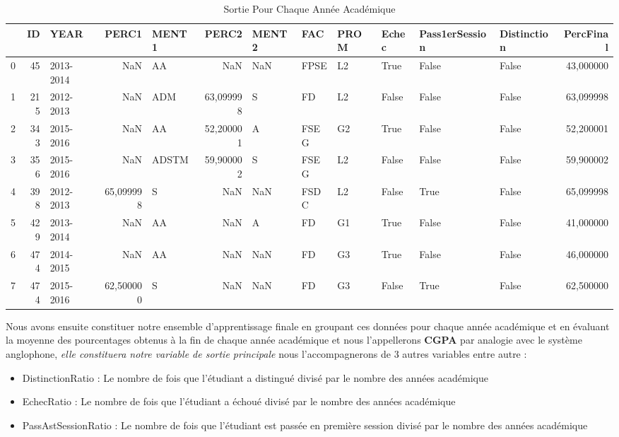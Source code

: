 \begin{table}
	\centering
	\begingroup %
	\captionsetup{type=table} %
	\caption{Sortie Pour Chaque Année Académique}
	\label{tab:Output1}
	\begin{tabular}{lrlrlrllllllr}
		\toprule
		{} &   ID &   YEAR &      PERC1 &  MENT1 &      PERC2 & MENT2 &   FAC & PROM &  Echec & Pass1erSession & Distinction &  PercFinal \\
		\midrule
		0 &   45 &  2013-2014 &        NaN &     AA &        NaN &   NaN &  FPSE &   L2 &   True &          False &       False &  43,000000 \\
		1 &  215 &  2012-2013 &        NaN &    ADM &  63,099998 &     S &    FD &   L2 &  False &          False &       False &  63,099998 \\
		2 &  343 &  2015-2016 &        NaN &     AA &  52,200001 &     A &  FSEG &   G2 &   True &          False &       False &  52,200001 \\
		3 &  356 &  2015-2016 &        NaN &  ADSTM &  59,900002 &     S &  FSEG &   L2 &  False &          False &       False &  59,900002 \\
		4 &  398 &  2012-2013 &  65,099998 &      S &        NaN &   NaN &  FSDC &   L2 &  False &           True &       False &  65,099998 \\
		5 &  429 &  2013-2014 &        NaN &     AA &        NaN &     A &    FD &   G1 &   True &          False &       False &  41,000000 \\
		6 &  474 &  2014-2015 &        NaN &     AA &        NaN &   NaN &    FD &   G3 &   True &          False &       False &  46,000000 \\
		7 &  474 &  2015-2016 &  62,500000 &      S &        NaN &   NaN &    FD &   G3 &  False &           True &       False &  62,500000 \\
		\bottomrule
	\end{tabular}
	\endgroup
\end{table}
 Nous avons ensuite constituer notre ensemble d'apprentissage finale en groupant ces données pour chaque année académique et en évaluant 
 la moyenne des pourcentages obtenus à la fin de chaque année académique  et nous l'appellerons \textbf{\ac{CGPA} }par analogie avec le système anglophone, \emph{elle constituera notre variable de sortie principale}  nous l'accompagnerons de 3 autres variables entre autre :
 \begin{itemize}
 	\item
 	DistinctionRatio : Le nombre de fois que l'étudiant a distingué
 	divisé par le nombre des années académique
 	\item
 	EchecRatio : Le nombre de fois que l'étudiant a échoué divisé par le
 	nombre des années académique
 	\item
 	PassAstSessionRatio : Le nombre de fois que l'étudiant est passée en
 	première session divisé par le nombre des années académique
 \end{itemize}
